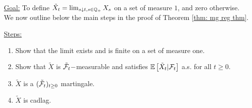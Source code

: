 \documentclass{article}
\begin{document}
\underline{Goal:} To define $ \tilde{X}_{t} = \lim_{s\downarrow t, s\in \mathbb{Q}_{+}} X_{s}$ on a set of measure $ 1$, and zero otherwise. We now outline below the main steps in the proof of Theorem \ref{thm: mg reg thm}. 

\underline{Steps:}
\begin{enumerate}
	\item Show that the limit exists and is finite on a set of measure one. 
	\item Show that $ \tilde{X}$ is $ \tilde{\mathcal{F}}_{t}-$measurable and satisfies $ \mathbb{E}\left[ \tilde{X}_{t}|\mathcal{F}_{t} \right]$ a.s. for all $ t\geq 0$.
	\item $ \tilde{X}$ is a $ (\tilde{\mathcal{F}}_{t})_{t\geq 0}$ martingale. 
	\item $ \tilde{X}$ is cadlag.
\end{enumerate}
\end{document}
